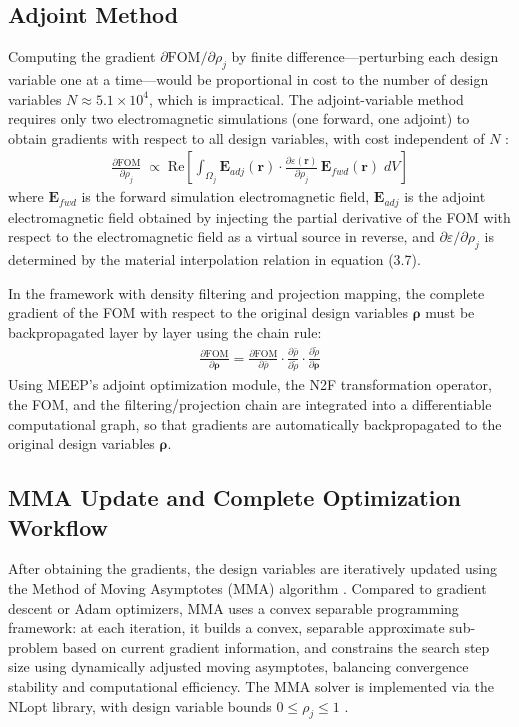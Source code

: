\subsection{Adjoint Method}

Computing the gradient $\partial \text{FOM}/\partial \rho_j$ by finite difference—perturbing each design variable one at a time—would be proportional in cost to the number of design variables $N \approx 5.1\times10^4$, which is impractical. The adjoint-variable method requires only two electromagnetic simulations (one forward, one adjoint) to obtain gradients with respect to all design variables, with cost independent of $N$ \cite{lalau2013adjoint}:
\begin{align}
\frac{\partial \text{FOM}}{\partial \rho_j} \;\propto\; \text{Re}\!\left[\int_{\Omega_j} \mathbf{E}_{adj} (\mathbf{r}) \cdot \frac{\partial \varepsilon (\mathbf{r})}{\partial \rho_j}\,\mathbf{E}_{fwd} (\mathbf{r})\; dV\right]
\end{align}
where $\mathbf{E}_{fwd}$ is the forward simulation electromagnetic field, $\mathbf{E}_{adj}$ is the adjoint electromagnetic field obtained by injecting the partial derivative of the FOM with respect to the electromagnetic field as a virtual source in reverse, and $\partial\varepsilon/\partial\rho_j$ is determined by the material interpolation relation in equation (3.7).

In the framework with density filtering and projection mapping, the complete gradient of the FOM with respect to the original design variables $\boldsymbol{\rho}$ must be backpropagated layer by layer using the chain rule:
\begin{align}
\frac{\partial \text{FOM}}{\partial \boldsymbol{\rho}} = \frac{\partial \text{FOM}}{\partial \bar\rho}\cdot \frac{\partial \bar\rho}{\partial \tilde\rho}\cdot \frac{\partial \tilde\rho}{\partial \boldsymbol{\rho}}
\end{align}
Using MEEP's adjoint optimization module, the N2F transformation operator, the FOM, and the filtering/projection chain are integrated into a differentiable computational graph, so that gradients are automatically backpropagated to the original design variables $\boldsymbol{\rho}$.

\subsection{MMA Update and Complete Optimization Workflow}

After obtaining the gradients, the design variables are iteratively updated using the Method of Moving Asymptotes (MMA) algorithm \cite{svanberg1987method}. Compared to gradient descent or Adam optimizers, MMA uses a convex separable programming framework: at each iteration, it builds a convex, separable approximate sub-problem based on current gradient information, and constrains the search step size using dynamically adjusted moving asymptotes, balancing convergence stability and computational efficiency. The MMA solver is implemented via the NLopt library, with design variable bounds $0 \le \rho_j \le 1$ \cite{johnson2014nlopt}.

